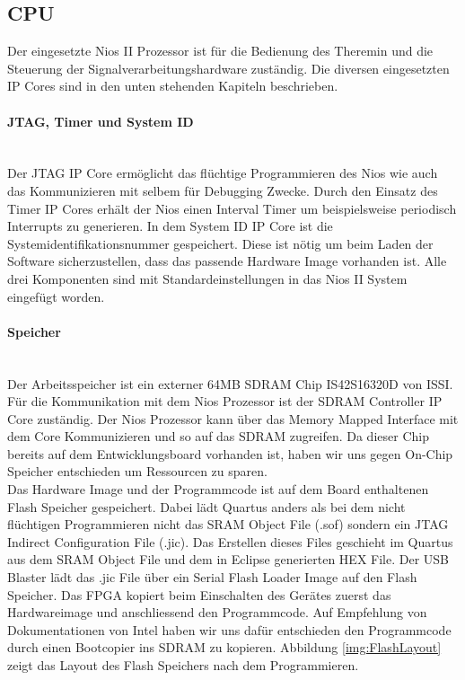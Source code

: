 \subsection{CPU}\label{subsec:CPU}
Der eingesetzte Nios II Prozessor ist für die Bedienung des Theremin und die Steuerung der Signalverarbeitungshardware zuständig. Die diversen eingesetzten IP Cores sind in den unten stehenden Kapiteln beschrieben.

\paragraph{JTAG, Timer und System ID}\mbox{}\\

Der JTAG IP Core ermöglicht das flüchtige Programmieren des Nios wie auch das Kommunizieren mit selbem für Debugging Zwecke. 
Durch den Einsatz des Timer IP Cores erhält der Nios einen Interval Timer um beispielsweise periodisch Interrupts zu generieren. 
In dem System ID IP Core ist die Systemidentifikationsnummer gespeichert. Diese ist nötig um beim Laden der Software sicherzustellen, dass das passende Hardware Image vorhanden ist.
Alle drei Komponenten sind mit Standardeinstellungen in das Nios II System eingefügt worden.

\paragraph{Speicher}\mbox{}\\

Der Arbeitsspeicher ist ein externer 64MB SDRAM Chip IS42S16320D von ISSI. Für die Kommunikation mit dem Nios Prozessor ist der SDRAM Controller IP Core zuständig. Der Nios Prozessor kann über das Memory Mapped Interface mit dem Core Kommunizieren und so auf das SDRAM zugreifen. Da dieser Chip bereits auf dem Entwicklungsboard vorhanden ist, haben wir uns gegen On-Chip Speicher entschieden um Ressourcen zu sparen.\\

Das Hardware Image und der Programmcode ist auf dem Board enthaltenen Flash Speicher gespeichert. Dabei lädt Quartus anders als bei dem nicht flüchtigen Programmieren nicht das SRAM Object File (.sof) sondern ein JTAG Indirect Configuration File (.jic). Das Erstellen dieses Files geschieht im Quartus aus dem SRAM Object File und dem in Eclipse generierten HEX File. Der USB Blaster lädt das .jic File über ein Serial Flash Loader Image auf den Flash Speicher. Das FPGA kopiert beim Einschalten des Gerätes zuerst das Hardwareimage und anschliessend den Programmcode. Auf Empfehlung von Dokumentationen von Intel haben wir uns dafür entschieden den Programmcode durch einen Bootcopier ins SDRAM zu kopieren. Abbildung \ref{img:FlashLayout} zeigt das Layout des Flash Speichers nach dem Programmieren. \cite{non_volatile}

